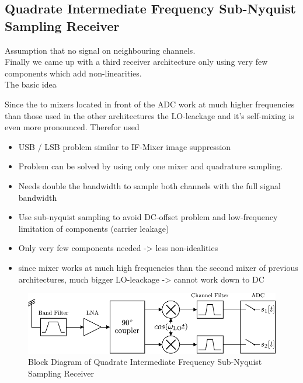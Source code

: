 \subsection{Quadrate Intermediate Frequency Sub-Nyquist Sampling Receiver}
Assumption that no signal on neighbouring channels. \\

Finally we came up with a third receiver architecture only using very
few components which add non-linearities. \\

The basic idea

Since the to mixers located in front of the \gls{ADC} work at much
higher frequencies than those used in the other architectures the
\gls{LO}-leackage and it's self-mixing is even more pronounced.
Therefor used


\begin{itemize}
\item USB / LSB problem similar to IF-Mixer image suppression
\item Problem can be solved by using only one mixer and quadrature sampling.
\item Needs double the bandwidth to sample both channels with the full
  signal bandwidth
\item Use sub-nyquist sampling to avoid DC-offset problem and low-frequency
  limitation of components (carrier leakage)
\item Only very few components needed -> less non-idealities
\item since mixer works at much high frequencies than the second mixer of
  previous architectures, much bigger LO-leackage -> cannot work down to DC
\end{itemize}

\begin{figure}[ht]
  \centering
  \includegraphics[width=\textwidth]{figures/quad_if_rx_block_diagram}
  \caption{Block Diagram of Quadrate Intermediate Frequency Sub-Nyquist Sampling Receiver}
  \label{fig:rx_2_bd}
\end{figure}


